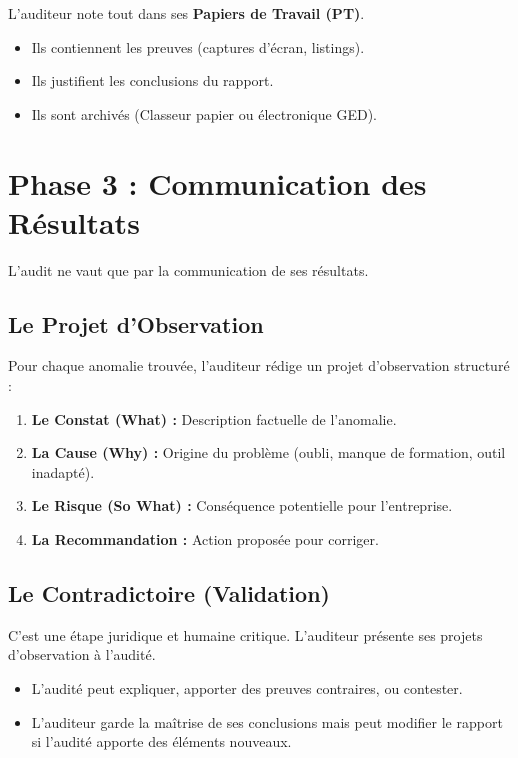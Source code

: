 L'auditeur note tout dans ses \textbf{Papiers de Travail (PT)}.
\begin{itemize}
    \item Ils contiennent les preuves (captures d'écran, listings).
    \item Ils justifient les conclusions du rapport.
    \item Ils sont archivés (Classeur papier ou électronique GED).
\end{itemize}

\section{Phase 3 : Communication des Résultats}

L'audit ne vaut que par la communication de ses résultats.

\subsection{Le Projet d'Observation}

Pour chaque anomalie trouvée, l'auditeur rédige un projet d'observation structuré :
\begin{enumerate}
    \item \textbf{Le Constat (What) :} Description factuelle de l'anomalie.
    \item \textbf{La Cause (Why) :} Origine du problème (oubli, manque de formation, outil inadapté).
    \item \textbf{Le Risque (So What) :} Conséquence potentielle pour l'entreprise.
    \item \textbf{La Recommandation :} Action proposée pour corriger.
\end{enumerate}

\subsection{Le Contradictoire (Validation)}

C'est une étape juridique et humaine critique. L'auditeur présente ses projets d'observation à l'audité.
\begin{itemize}
    \item L'audité peut expliquer, apporter des preuves contraires, ou contester.
    \item L'auditeur garde la maîtrise de ses conclusions mais peut modifier le rapport si l'audité apporte des éléments nouveaux.
\end{itemize}

